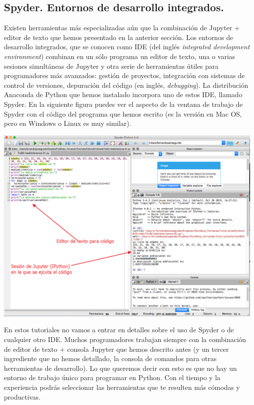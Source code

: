 \documentclass[10pt,a4paper]{article}\usepackage[]{graphicx}\usepackage[]{color}
\newcounter {cont01}
\begin{document}
\subsection{Spyder. Entornos de desarrollo integrados. }
\label{tut02:subsec:SpyderIDEs}

Existen herramientas más especializadas aún que la combinación de Jupyter + editor de texto que hemos presentado en la anterior sección. Los entornos de desarrollo integrados, que se conocen como IDE (del inglés {\em integrated development environment})  combinan en un sólo programa un editor de texto, una o varias sesiones simultáneas de Jupyter y otra serie de herramientas útiles para programadores más avanzados: gestión de proyectos, integración con sistemas de control de versiones, depuración del código (en inglés, {\em debugging}). La distribución Anaconda de Python que hemos instalado incorpora uno de estos IDE, llamado Spyder. En la siguiente figura puedes ver el aspecto de la ventana de trabajo de Spyder con el código del programa que hemos escrito (es la versión en Mac OS, pero en Windows o Linux es muy similar).
\begin{center}
\includegraphics[width=15cm]{../fig/Tut02-py-08-SpyderCapturaPantalla.png}
\end{center}
En estos tutoriales no vamos a entrar en detalles sobre el uso de Spyder o de cualquier otro IDE. Muchos programadores trabajan siempre con la combinación de editor de texto + consola Jupyter que hemos descrito antes (y un tercer ingrediente que no hemos detallado, la consola de comandos para otras herramientas de desarrollo). Lo que queremos decir con esto es que no hay un entorno de trabajo único para programar en Python. Con el tiempo y la experiencia podrás seleccionar las herramientas que te resulten más cómodas y productivas.
\end{document}
